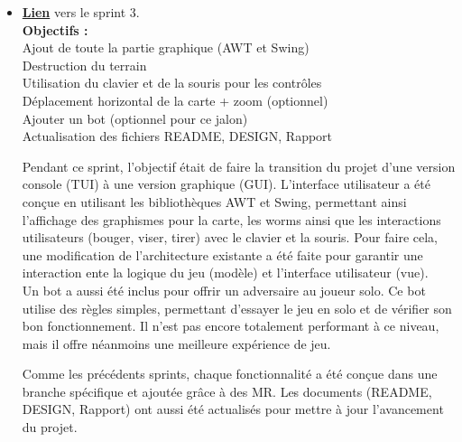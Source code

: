 \documentclass[a4paper, 12pt]{article}
\begin{document}
\begin{itemize}[itemsep=1cm]
            \subsection{Sprint 3 : Version graphique (1/12 - 28/12)}
                \item \href{https://moule.informatique.u-paris.fr/mesnildr/projet-worms/-/milestones/5#tab-issues}{\textbf{Lien}} vers le sprint 3.\\
                \newline
                \textbf{Objectifs :}\\
                    Ajout de toute la partie graphique (AWT et Swing)\\
                    Destruction du terrain\\
                    Utilisation du clavier et de la souris pour les contrôles\\
                    Déplacement horizontal de la carte + zoom (optionnel)\\
                    Ajouter un bot (optionnel pour ce jalon)\\
                    Actualisation des fichiers README, DESIGN, Rapport
                \newline

                Pendant ce sprint, l'objectif était de faire la transition du projet d'une version console (TUI) à une version graphique (GUI).
                L'interface utilisateur a été conçue en utilisant les bibliothèques AWT et Swing, permettant ainsi l'affichage des graphismes pour la carte, les worms ainsi que les interactions utilisateurs (bouger, viser, tirer) avec le clavier et la souris.
                Pour faire cela, une modification de l'architecture existante a été faite pour garantir une interaction ente la logique du jeu (modèle) et l'interface utilisateur (vue).\\
                
                Un bot a aussi été inclus pour offrir un adversaire au joueur solo.
                Ce bot utilise des règles simples, permettant d'essayer le jeu en solo et de vérifier son bon fonctionnement.
                Il n'est pas encore totalement performant à ce niveau, mais il offre néanmoins une meilleure expérience de jeu.

                Comme les précédents sprints, chaque fonctionnalité a été conçue dans une branche spécifique et ajoutée grâce à des MR.
                Les documents (README, DESIGN, Rapport) ont aussi été actualisés pour mettre à jour l'avancement du projet.
            

\end{itemize}
\end{document}
